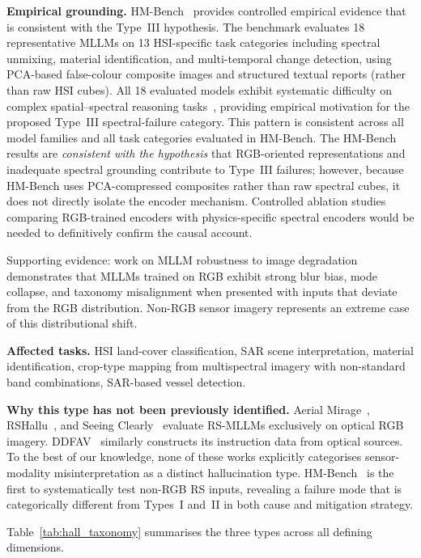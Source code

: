 \textbf{Empirical grounding.}
HM-Bench~\cite{hmbench2026} provides controlled empirical
evidence that is consistent with the Type~III hypothesis.
The benchmark evaluates 18 representative MLLMs on 13 HSI-specific task
categories including spectral unmixing, material identification, and
multi-temporal change detection, using PCA-based false-colour composite
images and structured textual reports (rather than raw HSI cubes).
All 18 evaluated models exhibit systematic difficulty on complex
spatial--spectral reasoning tasks~\cite{hmbench2026}, providing
empirical motivation for the proposed Type~III spectral-failure
category. This pattern is consistent across all model families and
all task categories evaluated in HM-Bench.
The HM-Bench results are \emph{consistent with the hypothesis} that
RGB-oriented representations and inadequate spectral grounding contribute
to Type~III failures; however, because HM-Bench uses PCA-compressed
composites rather than raw spectral cubes, it does not directly
isolate the encoder mechanism. Controlled ablation studies comparing
RGB-trained encoders with physics-specific spectral encoders would be
needed to definitively confirm the causal account.

Supporting evidence: work on MLLM robustness to image
degradation~\cite{degradation2025} demonstrates that MLLMs trained
on RGB exhibit strong blur bias, mode collapse, and taxonomy
misalignment when presented with inputs that deviate from the RGB
distribution. Non-RGB sensor imagery represents an extreme case of
this distributional shift.

\textbf{Affected tasks.}
HSI land-cover classification, SAR scene interpretation, material
identification, crop-type mapping from multispectral imagery with
non-standard band combinations, SAR-based vessel detection.

\textbf{Why this type has not been previously identified.}
Aerial Mirage~\cite{aerialmirage2026}, RSHallu~\cite{rshallu2026},
and Seeing Clearly~\cite{seeingclearly2026} evaluate RS-MLLMs
exclusively on optical RGB imagery. DDFAV~\cite{ddfav2025} similarly
constructs its instruction data from optical sources. To the best of
our knowledge, none of these works explicitly categorises sensor-modality
misinterpretation as a distinct hallucination type.
HM-Bench~\cite{hmbench2026} is the first to systematically test non-RGB
RS inputs, revealing a failure mode that is categorically different from Types~I
and~II in both cause and mitigation strategy.

Table~\ref{tab:hall_taxonomy} summarises the three types across all
defining dimensions.

